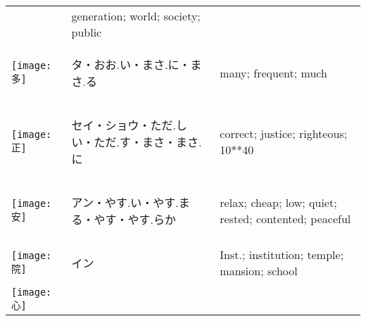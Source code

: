 \documentclass[a4paper,12pt]{extarticle}
\begin{document}
\begin{longtable}{|lp{6cm}p{4cm}|}
&
generation; world; society; public
\\ 
\begin{minipage}{0.3\textwidth}
\centerline{
	\texttt{[image: 多]}
}
\end{minipage}
&
\begin{CJK}{UTF8}{min}タ・おお.い・まさ.に・まさ.る\end{CJK}
&
many; frequent; much
\\ 
\begin{minipage}{0.3\textwidth}
\centerline{
	\texttt{[image: 正]}
}
\end{minipage}
&
\begin{CJK}{UTF8}{min}セイ・ショウ・ただ.しい・ただ.す・まさ・まさ.に\end{CJK}
&
correct; justice; righteous; 10**40
\\ 
\begin{minipage}{0.3\textwidth}
\centerline{
	\texttt{[image: 安]}
}
\end{minipage}
&
\begin{CJK}{UTF8}{min}アン・やす.い・やす.まる・やす・やす.らか\end{CJK}
&
relax; cheap; low; quiet; rested; contented; peaceful
\\ 
\begin{minipage}{0.3\textwidth}
\centerline{
	\texttt{[image: 院]}
}
\end{minipage}
&
\begin{CJK}{UTF8}{min}イン\end{CJK}
&
Inst.; institution; temple; mansion; school
\\ 
\begin{minipage}{0.3\textwidth}
\centerline{
	\texttt{[image: 心]}
}
\end{minipage}

\end{longtable}
\end{document}
